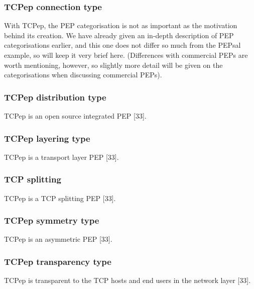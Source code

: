 \documentclass{uathesis}
\begin{document}
\subsubsection*{TCPep connection type}
With TCPep, the PEP categorisation is not as important as the motivation behind its creation. We have already given an in-depth description of PEP categorisations earlier, and this one does not differ so much from the PEPsal example, so will keep it very brief here. (Differences with commercial PEPs are worth mentioning, however, so slightly more detail will be given on the categorisations when discussing commercial PEPs). 

\subsubsection*{TCPep distribution type}
TCPep is an open source integrated PEP [33]. 

\subsubsection*{TCPep layering type}
TCPep is a transport layer PEP [33].

\subsubsection*{TCP splitting}
TCPep is a TCP splitting PEP [33].

\subsubsection*{TCPep symmetry type}
TCPep is an asymmetric PEP [33].

\subsubsection*{TCPep transparency type}
TCPep is transparent to the TCP hosts and end users in the network layer [33]. 
\end{document}
